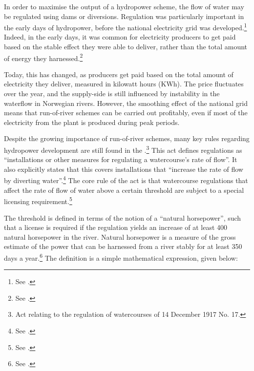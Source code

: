 In order to maximise the output of a hydropower scheme, the flow of water may be regulated using dams or diversions. Regulation was particularly important in the early days of hydropower, before the national electricity grid was developed.\footnote{See \cite[83]{uleberg08}.} %
Indeed, in the early days, it was common for electricity producers to get paid based on the stable effect they were able to deliver, rather than the total amount of energy they harnessed.\footnote{See \cite{sofienlund07}.}

Today, this has changed, as producers get paid based on the total amount of electricity they deliver,  measured in kilowatt hours (KWh). The price fluctuates over the year, and the supply-side is still influenced by instability in the waterflow in Norwegian rivers. However, the smoothing effect of the national grid means that run-of-river schemes can be carried out profitably, even if most of the electricity from the plant is produced during peak periods. %

Despite the growing importance of run-of-river schemes, many key rules regarding hydropower development are still found in the \cite{wra17}.\footnote{Act relating to the regulation of watercourses of 14 December 1917 No. 17.} This act defines regulations as ``installations or other measures for regulating a watercourse's rate of flow''. It also explicitly states that this covers installations that ``increase the rate of flow by diverting water''.\footnote{See \cite[1]{wra17}.} The core rule of the act is that watercourse regulations that affect the rate of flow of water above a certain threshold are subject to a special licensing requirement.\footnote{See \cite[2]{wra17}.}

The threshold is defined in terms of the notion of a ``natural horsepower'', such that a license is required if the regulation yields an increase of at least 400 natural horsepower in the river. Natural horsepower is a measure of the gross estimate of the power that can be harnessed from a river stably for at least 350 days a year.\footnote{See \cite[2]{wra17}.} The definition is a simple mathematical expression, given below:

